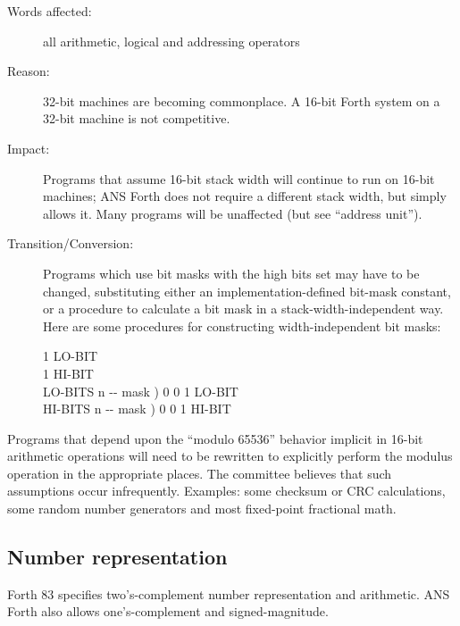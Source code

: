 \begin{description}
\item[Words affected:]
	all arithmetic, logical and addressing operators

\item[Reason:]
	32-bit machines are becoming commonplace. A 16-bit Forth
	system on a 32-bit machine is not competitive.

\item[Impact:]
	Programs that assume 16-bit stack width will continue to run on
	16-bit machines; ANS Forth does not require a different stack
	width, but simply allows it. Many programs will be unaffected
	(but see ``address unit'').

\item[Transition/Conversion:]
	Programs which use bit masks with the high bits set may have to
	be changed, substituting either an implementation-defined bit-mask
	constant, or a procedure to calculate a bit mask in a
	stack-width-independent way. Here are some procedures for
	constructing width-in\-de\-pend\-ent bit masks:

	\begin{tt}
		1  LO-BIT \\
		 1 
			\quad {}
			\quad {} HI-BIT \\
		\word{:} LO-BITS  n -{}- mask )
			0 	0 
				1 		LO-BIT 
		\word{;} \\
		\word{:} HI-BITS  n -{}- mask )
			0 	0 
				1 	HI-BIT 
		\word{;}
	\end{tt}
\end{description}

Programs that depend upon the ``modulo 65536'' behavior implicit in
16-bit arithmetic operations will need to be rewritten to explicitly
perform the modulus operation in the appropriate places. The committee
believes that such assumptions occur infrequently. Examples: some
checksum or CRC calculations, some random number generators and most
fixed-point fractional math.

\subsection{Number representation} %

Forth 83 specifies two's-complement number representation and
arithmetic. ANS Forth also allows one's-complement and
signed-magnitude.

